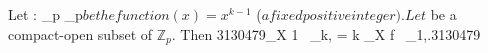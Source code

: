 Let : _p \to {}_p$ be the function (x) = x^{k-1}$ ($ a fixed positive integer). Let $ be a compact-open subset of $\mathbb{Z}_p$. Then
3130479\int_X 1 \, \mu_{k,\alpha} = k \int_X f \, \mu_{1,\alpha}.3130479
